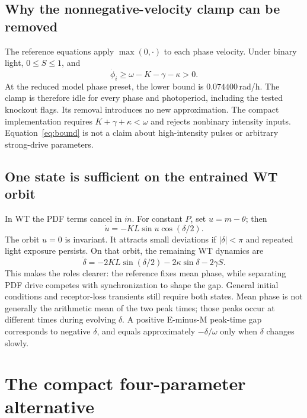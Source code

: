 \documentclass[11pt,letterpaper]{article}
\begin{document}
\subsection{Why the nonnegative-velocity clamp can be removed}

The reference equations apply $\max(0,\cdot)$ to each phase velocity.
Under binary light, $0\leq S\leq1$, and
\begin{equation}
\dot\phi_i\geq \omega-K-\gamma-\kappa>0.
\label{eq:bound}
\end{equation}
At the reduced model phase preset, the lower bound is $0.074400$\,rad/h.
The clamp is therefore idle for every phase and photoperiod, including
the tested knockout flags. Its removal introduces no new approximation.
The compact implementation requires $K+\gamma+\kappa<\omega$ and rejects
nonbinary intensity inputs. Equation~\eqref{eq:bound} is not a claim
about high-intensity pulses or arbitrary strong-drive parameters.

\subsection{One state is sufficient on the entrained WT orbit}

In WT the PDF terms cancel in $\dot m$.
For constant $P$, set $u=m-\theta$; then
\begin{equation}
\dot u=-KL\sin u\cos(\delta/2).
\end{equation}
The orbit $u=0$ is invariant. It attracts small deviations if
$|\delta|<\pi$ and repeated light exposure persists. On that orbit,
the remaining WT dynamics are
\begin{equation}
\dot\delta=-2KL\sin(\delta/2)-2\kappa\sin\delta-2\gamma S.
\label{eq:scalar}
\end{equation}
This makes the roles clearer: the reference fixes mean phase, while
separating PDF drive competes with synchronization to shape the gap.
General initial conditions and receptor-loss transients still require
both states. Mean phase is not generally the arithmetic mean of the two
peak times; those peaks occur at different times during evolving $\delta$.
A positive E-minus-M peak-time gap corresponds to negative $\delta$,
and equals approximately $-\delta/\omega$ only when $\delta$ changes slowly.

\clearpage
\section{The compact four-parameter alternative}
\end{document}
